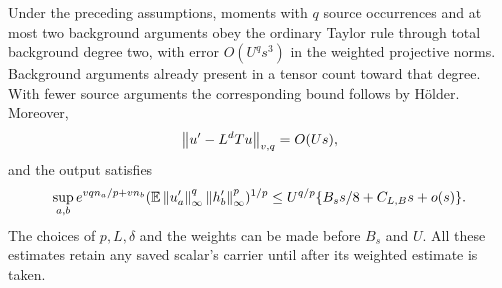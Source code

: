 \begin{proposition}
\label{norm:source}
Under the preceding assumptions, moments with $q$ source occurrences
and at most two background arguments obey the ordinary Taylor rule
through total background degree two,
with error $O(U^qs^3)$ in the weighted projective norms.  Background
arguments already present in a tensor count toward that degree.
With fewer source arguments the corresponding bound follows by
H\"older.  Moreover,
\begin{equation}\label{norm:source-difference}
               \left\lVert u'-L^dTu\right\rVert_{v,q}=O(Us),
\end{equation}
and the output satisfies
\begin{equation}\label{norm:mixed-output}
 \sup_{a,b}e^{vq n_a/p+vn_b}
       (\mathbb E\left\lVert u'_a\right\rVert_\infty^q\left\lVert h'_b\right\rVert_\infty^p)^{1/p}
 \le U^{q/p}\{B_s s/8+C_{L,B}s+o(s)\}.
\end{equation}
The choices of $p,L,\delta$ and the weights can be made before
$B_s$ and $U$.  All these estimates retain any saved scalar's carrier
until after its weighted estimate is taken.
\end{proposition}
